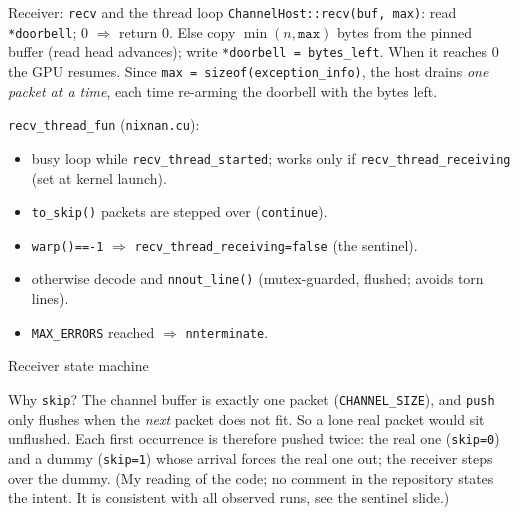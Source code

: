 \documentclass[aspectratio=169,10pt]{beamer}
\begin{document}
\begin{frame}{Receiver: \texttt{recv} and the thread loop}
\small
\texttt{ChannelHost::recv(buf, max)}: read \texttt{*doorbell}; 0 $\Rightarrow$ return 0. Else copy $\min(n,\texttt{max})$ bytes from the pinned buffer (read head advances); write \texttt{*doorbell = bytes\_left}. When it reaches 0 the GPU resumes. Since \texttt{max = sizeof(exception\_info)}, the host drains \emph{one packet at a time}, each time re-arming the doorbell with the bytes left.

\medskip
\texttt{recv\_thread\_fun} (\texttt{nixnan.cu}):
\begin{itemize}
\item busy loop while \texttt{recv\_thread\_started}; works only if \texttt{recv\_thread\_receiving} (set at kernel launch).
\item \texttt{to\_skip()} packets are stepped over (\texttt{continue}).
\item \texttt{warp()==-1} $\Rightarrow$ \texttt{recv\_thread\_receiving=false} (the sentinel).
\item otherwise decode and \texttt{nnout\_line()} (mutex-guarded, flushed; avoids torn lines).
\item \texttt{MAX\_ERRORS} reached $\Rightarrow$ \texttt{nnterminate}.
\end{itemize}
\end{frame}

\begin{frame}{Receiver state machine}
\centering
{}

\small Why \texttt{skip}? The channel buffer is exactly one packet (\texttt{CHANNEL\_SIZE}), and \texttt{push} only flushes when the \emph{next} packet does not fit. So a lone real packet would sit unflushed. Each first occurrence is therefore pushed twice: the real one (\texttt{skip=0}) and a dummy (\texttt{skip=1}) whose arrival forces the real one out; the receiver steps over the dummy. (My reading of the code; no comment in the repository states the intent. It is consistent with all observed runs, see the sentinel slide.)
\end{frame}
\end{document}
